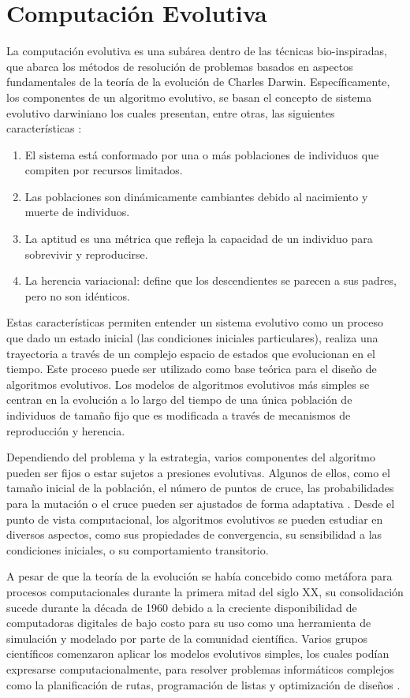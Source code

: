 
\chapter{Computación Evolutiva} 
\label{Chapter4} 
La computación evolutiva es una subárea dentro de las técnicas bio-inspiradas, que abarca los métodos de resolución de problemas basados en aspectos fundamentales de la teoría de la evolución de Charles Darwin. Específicamente, los componentes de un algoritmo evolutivo, se basan el concepto de sistema evolutivo darwiniano los cuales presentan, entre otras, las siguientes características \cite{de2006evolutionary}:
\begin{enumerate}
\item El sistema está conformado por una o más poblaciones de individuos que compiten por recursos limitados.
\item Las poblaciones son dinámicamente cambiantes debido al nacimiento y muerte de individuos.
\item La aptitud es una métrica que refleja la capacidad de un individuo para sobrevivir y reproducirse.
\item La herencia variacional: define que los descendientes se parecen a sus padres, pero no son idénticos.
\end{enumerate}
Estas características  permiten entender un sistema evolutivo como un proceso que dado un estado inicial (las condiciones iniciales particulares), realiza una trayectoria a través de un complejo espacio de estados que evolucionan en el tiempo. Este proceso puede ser utilizado como base teórica para el diseño de algoritmos evolutivos. Los modelos de algoritmos evolutivos más simples se centran en la evolución a lo largo del tiempo de una única población de individuos de tamaño fijo que es modificada a través de  mecanismos de reproducción y herencia.

 Dependiendo del problema y la estrategia, varios componentes  del algoritmo pueden ser fijos o estar sujetos a presiones evolutivas. Algunos de ellos, como el tamaño inicial de la población, el número de puntos de cruce, las probabilidades para la mutación o el cruce pueden ser ajustados de forma adaptativa \cite{angeline1995adaptive}. Desde el punto de vista computacional, los algoritmos evolutivos se pueden estudiar en diversos aspectos, como sus propiedades de convergencia, su sensibilidad a las condiciones iniciales, o su comportamiento transitorio. 

A pesar de que la teoría de la evolución se había concebido como metáfora para procesos computacionales durante la primera mitad del siglo XX, su consolidación sucede durante la década de 1960 debido a la creciente disponibilidad de computadoras digitales de bajo costo para su uso como una herramienta de simulación y modelado por parte de la comunidad científica. Varios grupos científicos comenzaron aplicar los modelos evolutivos simples, los cuales podían expresarse computacionalmente, para resolver problemas informáticos complejos como la planificación de rutas, programación de listas y optimización de diseños \cite{holland1992adaptation}\cite{weise2009global}. 

